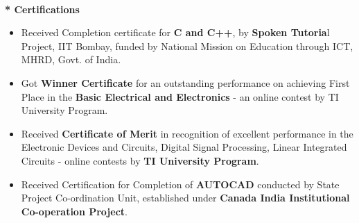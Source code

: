 \documentclass{article}
\begin{document}
\begin{flushleft}
\begin{enumerate}
\begin{itemize}
\end{itemize}
\end{enumerate}

\textbf{\\*  Certifications}
\begin{itemize}
\item Received Completion certificate for \textbf{C and C++}, by \textbf{Spoken Tutoria}l Project, IIT Bombay, funded by National Mission on Education through ICT, MHRD, Govt. of India.
\item Got \textbf{Winner Certificate} for an outstanding performance on achieving First Place in the \textbf{Basic Electrical and Electronics} - an online contest by TI University Program.
\item Received \textbf{Certificate of Merit} in recognition of excellent performance in the {Electronic Devices and Circuits, Digital Signal Processing, Linear Integrated Circuits} - online contests by \textbf{TI University Program}.
\item Received Certification for Completion of \textbf{AUTOCAD} conducted by State Project Co-ordination Unit, established under \textbf{Canada India Institutional Co-operation Project}.
\end{itemize}
\end{flushleft}
\end{document}
